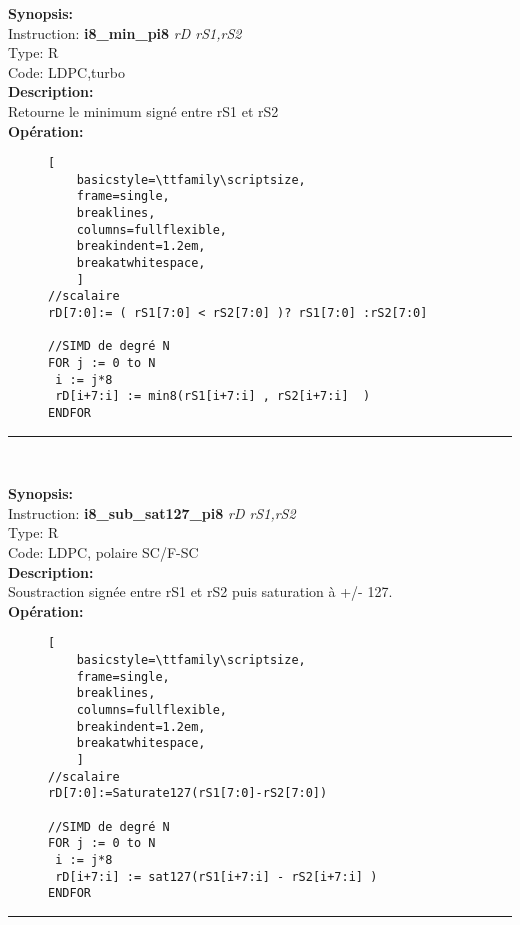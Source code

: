 {\scriptsize
\textbf{Synopsis:}\\
Instruction: \textbf{i8\_min\_pi8 } \textit{rD rS1,rS2}\\
Type: R\\
Code: LDPC,turbo\\
\textbf{Description:}\\
Retourne le minimum signé entre rS1 et rS2\\
\textbf{Opération:}\\
    \begin{figure}[H]
    \begin{lstlisting}[
    basicstyle=\ttfamily\scriptsize,
    frame=single,
    breaklines,
    columns=fullflexible,
    breakindent=1.2em,
    breakatwhitespace,
    ]
//scalaire
rD[7:0]:= ( rS1[7:0] < rS2[7:0] )? rS1[7:0] :rS2[7:0]
    
//SIMD de degré N
FOR j := 0 to N    
 i := j*8    
 rD[i+7:i] := min8(rS1[i+7:i] , rS2[i+7:i]  ) 
ENDFOR
\end{lstlisting}
\end{figure}
}
\rule{8cm}{0.4pt}\\
{\scriptsize
\textbf{Synopsis:}\\
Instruction: \textbf{i8\_sub\_sat127\_pi8 } \textit{rD rS1,rS2}\\
Type: R\\
Code: LDPC, polaire SC/F-SC\\
\textbf{Description:}\\
Soustraction signée entre rS1 et rS2 puis saturation à +/- 127.\\
\textbf{Opération:}\\
    \begin{figure}[H]
    \begin{lstlisting}[
    basicstyle=\ttfamily\scriptsize,
    frame=single,
    breaklines,
    columns=fullflexible,
    breakindent=1.2em,
    breakatwhitespace,
    ]
//scalaire
rD[7:0]:=Saturate127(rS1[7:0]-rS2[7:0])
    
//SIMD de degré N
FOR j := 0 to N    
 i := j*8    
 rD[i+7:i] := sat127(rS1[i+7:i] - rS2[i+7:i] ) 
ENDFOR
\end{lstlisting}
\end{figure}
}
\rule{8cm}{0.4pt}\\
